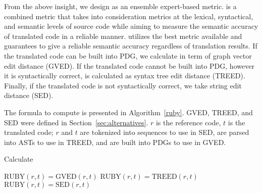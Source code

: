 


From the above insight, we design {\model} as an ensemble expert-based
metric. {\model} is a combined metric that takes into consideration
metrics at the lexical, syntactical, and semantic levels of source
code while aiming to measure the semantic accuracy of translated code
in a reliable manner. {\model} utilizes the best metric available and
guarantees to give a reliable semantic accuracy regardless of
translation results. If the translated code can be built into PDG, we
calculate {\model} in term of graph vector edit distance (GVED). If
the translated code cannot be built into PDG, however it is
syntactically correct, {\model} is calculated as syntax tree edit
distance (TREED). Finally, if the translated code is not syntactically
correct, we take string edit distance (SED).

The formula to compute {\model} is presented in Algorithm~\ref{ruby}. GVED,
TREED, and SED were defined in Section~\ref{sec:alternatives}. $r$ is
the reference code, $t$ is the translated code; $r$ and $t$ are tokenized
into sequences to use in SED, are parsed into ASTs to use in TREED,
and are built into PDGs to use in GVED.  \makeatletter
\def\BState{\State\hskip-\ALG@thistlm} \makeatother
\begin{algorithm}
\caption{Calculate {\model}}\label{ruby}
\begin{algorithmic}[1]
\State $\mbox{RUBY}\left(r,t\right) = \mbox{GVED}\left(r,t\right) $
\State $\mbox{RUBY}\left(r,t\right) = \mbox{TREED}\left(r,t\right) $
\Else 
\State $\mbox{RUBY}\left(r,t\right) = \mbox{SED}\left(r,t\right) $
\EndIf
\end{algorithmic}
\end{algorithm}

